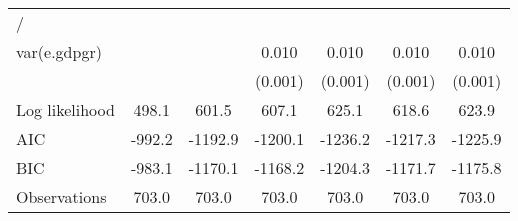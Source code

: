 \begin{table}[htbp]
\begin{tabular}{l*{6}{c}}
\hline
/                   &                     &                     &                     &                     &                     &                     \\
var(e.gdpgr)        &                     &                     &       0.010\sym{***}&       0.010\sym{***}&       0.010\sym{***}&       0.010\sym{***}\\
                    &                     &                     &     (0.001)         &     (0.001)         &     (0.001)         &     (0.001)         \\
\hline
Log likelihood      &       498.1         &       601.5         &       607.1         &       625.1         &       618.6         &       623.9         \\
AIC                 &      -992.2         &     -1192.9         &     -1200.1         &     -1236.2         &     -1217.3         &     -1225.9         \\
BIC                 &      -983.1         &     -1170.1         &     -1168.2         &     -1204.3         &     -1171.7         &     -1175.8         \\
Observations        &       703.0         &       703.0         &       703.0         &       703.0         &       703.0         &       703.0         \\
\hline\hline
\end{tabular}
\end{table}
